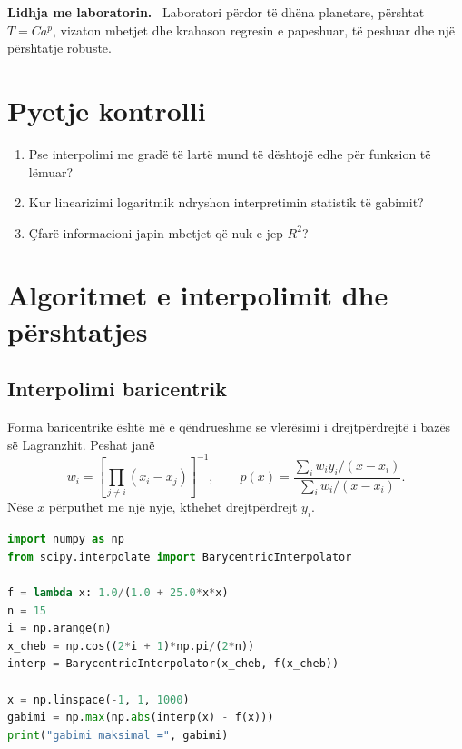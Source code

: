 \documentclass[11pt,oneside,openany]{book}
\newenvironment{lidhje}{\par\medskip\noindent\textbf{Lidhja me laboratorin.}\ }{\par\medskip}
\begin{document}
\begin{lidhje}
Laboratori përdor të dhëna planetare, përshtat $T=C a^p$, vizaton mbetjet dhe krahason regresin e papeshuar, të peshuar dhe një përshtatje robuste.
\end{lidhje}

\section*{Pyetje kontrolli}
\begin{enumerate}
\item Pse interpolimi me gradë të lartë mund të dështojë edhe për funksion të lëmuar?
\item Kur linearizimi logaritmik ndryshon interpretimin statistik të gabimit?
\item Çfarë informacioni japin mbetjet që nuk e jep $R^2$?
\end{enumerate}

\section{Algoritmet e interpolimit dhe përshtatjes}
\subsection{Interpolimi baricentrik}
Forma baricentrike është më e qëndrueshme se vlerësimi i drejtpërdrejtë i bazës së Lagranzhit. Peshat janë
\begin{equation}
 w_i=\left[\prod_{j\ne i}(x_i-x_j)\right]^{-1},\qquad
 p(x)=\frac{\sum_iw_iy_i/(x-x_i)}{\sum_iw_i/(x-x_i)}.
\end{equation}
Nëse $x$ përputhet me një nyje, kthehet drejtpërdrejt $y_i$.

\begin{lstlisting}[language=Python,caption={Interpolimi baricentrik nga SciPy.}]
import numpy as np
from scipy.interpolate import BarycentricInterpolator

f = lambda x: 1.0/(1.0 + 25.0*x*x)
n = 15
i = np.arange(n)
x_cheb = np.cos((2*i + 1)*np.pi/(2*n))
interp = BarycentricInterpolator(x_cheb, f(x_cheb))

x = np.linspace(-1, 1, 1000)
gabimi = np.max(np.abs(interp(x) - f(x)))
print("gabimi maksimal =", gabimi)
\end{lstlisting}
\end{document}
